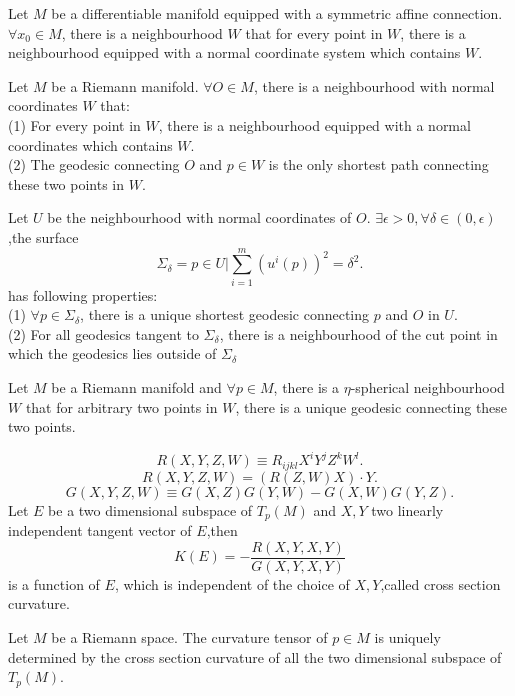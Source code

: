 \begin{newthem}
Let $M$ be a differentiable manifold equipped with a symmetric affine connection. $\forall x_0 \in M$, there is a neighbourhood $W$ that for every point in $W$, there is a neighbourhood equipped with a normal coordinate system which contains $W$.
\end{newthem}

\begin{newthem}
Let $M$ be a Riemann manifold. $\forall O \in M$, there is a neighbourhood with normal coordinates $W$ that:\\
(1) For every point in $W$, there is a neighbourhood equipped with a normal coordinates which contains $W$.\\
(2) The geodesic connecting $O$ and $p \in W$ is the only shortest path connecting these two points in $W$.
\end{newthem}

\begin{newthem}
Let $U$ be the neighbourhood with normal coordinates of $O$. $\exists \epsilon >0, \forall \delta \in (0,\epsilon)$,the surface
\[\Sigma_{\delta} = {p \in U | \sum_{i=1}^{m}} (u^i(p))^2 = \delta^2.\]
has following properties:\\
(1) $\forall p \in \Sigma_{\delta}$, there is a unique shortest geodesic connecting $p$ and $O$ in $U$.\\
(2) For all geodesics tangent to $\Sigma_{\delta}$, there is a neighbourhood of the cut point in which the geodesics lies outside of $\Sigma_{\delta}$
\end{newthem}

\begin{newthem}
Let $M$ be a Riemann manifold and $\forall p \in M$, there is a $\eta$-spherical neighbourhood $W$ that for arbitrary two points in $W$, there is a unique geodesic connecting these two points.
\end{newthem}

\begin{newdef}
\[R(X,Y,Z,W) \equiv R_{ijkl}X^iY^jZ^kW^l.\]
\[R(X,Y,Z,W) = (R(Z,W)X) \cdot Y.\]
\[G(X,Y,Z,W) \equiv G(X,Z)G(Y,W) - G(X,W)G(Y,Z).\]
Let $E$ be a two dimensional subspace of $T_p(M)$ and $X,Y$ two linearly independent tangent vector of $E$,then
\[K(E) = -\frac{R(X,Y,X,Y)}{G(X,Y,X,Y)} \]
is a function of $E$, which is independent of the choice of $X,Y$,called cross section curvature.
\end{newdef}

\begin{newthem} 
Let $M$ be a Riemann space. The curvature tensor of $p \in M$ is uniquely determined by the cross section curvature of all the two dimensional subspace of $T_p(M)$.
\end{newthem}

